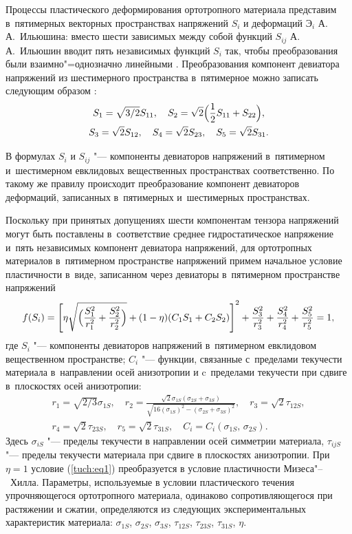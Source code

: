 Процессы пластического деформирования ортотропного материала представим в~пятимерных векторных пространствах напряжений $S_i $ и деформаций $\text{Э}_i$ А.\,А.~Ильюшина: вместо шести зависимых между собой функций $S_{ij} $ А.\,А.~Ильюшин вводит пять независимых функций $S_i$ так, чтобы преобразования были взаимно"=однозначно линейными \cite{tuch:bib2}. 
Преобразования компонент девиатора напряжений из шестимерного пространства в~пятимерное можно записать следующим образом \cite{tuch:bib2}:
\begin{gather*}
S_1 = \sqrt {{3}/{2}} S_{11},\quad S_2 = \sqrt 2 \Bigl(\frac{1}{2}S_{11} + S_{22} \Bigr), \\
 S_3 = \sqrt 2 S_{12} ,\quad S_4 = \sqrt 2 S_{23} ,\quad S_5 = \sqrt 2 S_{31}.
\end{gather*}

В формулах $S_i $ и $S_{ij} $ "--- компоненты девиаторов напряжений в~пятимерном и~шестимерном евклидовых вещественных пространствах соответственно. 
По такому же правилу происходит преобразование компонент девиаторов деформаций, записанных в~пятимерных и~шестимерных пространствах.

Поскольку при принятых допущениях шести компонентам тензора напряжений могут быть поставлены в~соответствие среднее гидростатическое напряжение и~пять независимых компонент девиатора напряжений, для ортотропных материалов в~пятимерном пространстве напряжений примем начальное условие пластичности \cite{tuch:bib3} в~виде, записанном через девиаторы в~пятимерном пространстве напряжений
\begin{equation}
\label{tuch:eq1}
f(S_i ) = \left[\eta \sqrt {\Bigl( \frac{S_1^2 }{r_1^2 } + \frac{S_2^2 }{r_2^2 } \Bigr)} + (1 - \eta )(C_1 S_1 + C_2 S_2 )\right]^2 +
\frac{S_3^2 }{r_3^2 } + \frac{S_4^2 }{r_4^2 } + \frac{S_5^2 }{r_5^2 } =
1,
\end{equation}
где $S_i $ "--- компоненты девиаторов напряжений в~пятимерном евклидовом вещественном пространстве; $C_i $ "--- функции, связанные с~пределами текучести материала в~направлении осей анизотропии и c~пределами текучести при сдвиге в~плоскостях осей анизотропии:
\begin{gather*}
r_1 = \sqrt {{2}/{3}} \sigma _{1S}, \quad
r_2 = \frac{\sqrt 2 \sigma _{1S} (\sigma _{2S} + \sigma _{3S} )}{\sqrt
{16(\sigma _{1S} )^2 - (\sigma _{2S} + \sigma _{3S} )^2}}, \quad
r_3 = \sqrt 2 \tau _{12S},\\
r_4 = \sqrt 2 \tau _{23S}, \quad r_5 = \sqrt 2 \tau _{31S}, \quad C_i = C_i (\sigma _{1S},\,\sigma _{2S}).
\end{gather*}
Здесь $\sigma _{iS} $ "--- пределы текучести в направлении осей симметрии
материала, $\tau _{ijS} $ "--- пределы текучести материала при сдвиге в
плоскостях анизотропии. При $\eta =1$ условие (\ref{tuch:eq1}) преобразуется в условие
пластичности Мизеса"--~Хилла. Параметры, используемые в условии пластического
течения упрочняющегося ортотропного материала, одинаково сопротивляющегося
при растяжении и сжатии, определяются из следующих экспериментальных
характеристик материала: $\sigma _{1S}$, $\sigma _{2S}$, $\sigma _{3S}$, $\tau
_{12S}$, $\tau _{23S}$, $\tau _{31S}$, $\eta$.

